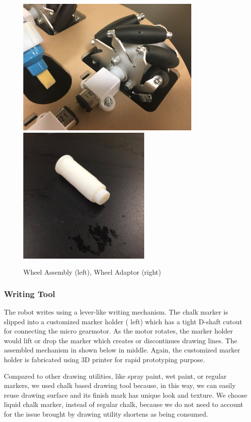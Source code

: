 \begin{figure}[h!]
\centering
\includegraphics[width=0.49\columnwidth]{figs/locomotion1.png}
\includegraphics[width=0.49\columnwidth]{figs/locomotion2.png}
\caption{Wheel Assembly (left),  Wheel Adaptor (right)}
\label{fig:so2}
\end{figure}

\subsubsection{Writing Tool}
\label{sec:me_writing}
The robot writes using a lever-like writing mechanism. The chalk marker is slipped into a customized marker holder ( left) which has a tight D-shaft cutout for connecting the micro gearmotor. As the motor rotates, the marker holder would lift or drop the marker which creates or discontinues drawing lines. The assembled mechanism in shown below in  middle. Again, the customized marker holder is fabricated using 3D printer for rapid prototyping purpose. 

Compared to other drawing utilities, like spray paint, wet paint, or regular markers, we used chalk based drawing tool because, in this way, we can easily reuse drawing surface and its finish mark has unique look and texture. We choose liquid chalk marker, instead of regular chalk, because we do not need to account for the issue brought by drawing utility shortens as being consumed. 

